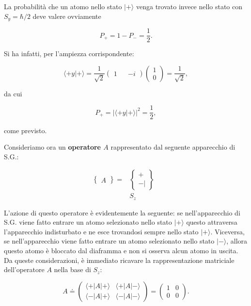 \documentclass[a4paper,12pt,oneside]{book}
\begin{document}
La probabilità che un atomo nello stato $| + \rangle $  venga trovato invece nello stato con $S_y=\hbar/2$ deve valere ovviamente

\begin{equation}
P_+= 1-P_-=\frac{1}{2} .
\end{equation}

Si ha infatti, per l'ampiezza corrispondente:

\begin{equation}
\langle +y | + \rangle = \frac{1}{\sqrt{2}}
\begin{pmatrix}
1 && -i
\end{pmatrix}
\begin{pmatrix}
1 \\
0
\end{pmatrix}=
\frac{1}{\sqrt{2}} ,
\end{equation}

da cui

\begin{equation}
P_+= |\langle +y | + \rangle |^2=\frac{1}{2} ,
\end{equation}

come previsto.

Consideriamo ora un \textbf{operatore $A$} rappresentato dal seguente apparecchio di S.G.:

\begin{eqnarray}
\begin{Bmatrix}
 A
\end{Bmatrix}
=
&\begin{Bmatrix}
 +  \\ - |  
\end{Bmatrix}&\\
&S_z& \nonumber 
\end{eqnarray}

L'azione di questo operatore è evidentemente la seguente:
se nell'apparecchio di S.G. viene fatto entrare un atomo selezionato nello stato $| + \rangle$ questo attraversa l'apparecchio indisturbato e ne esce trovandosi sempre nello stato $| + \rangle $. Viceversa, se nell'apparecchio viene fatto entrare un atomo selezionato nello stato $| - \rangle $, allora questo atomo è bloccato dal diaframma e non si osserva alcun atomo in uscita. Da queste considerazioni, è immediato ricavare la rappresentazione matriciale dell'operatore $A$ nella base di $S_z$:

\begin{equation}
A \doteq 
\begin{pmatrix}
\langle + | A | + \rangle & \langle + | A | - \rangle \\
\langle - | A | + \rangle & \langle - | A | - \rangle
\end{pmatrix}=
\begin{pmatrix}
1 & 0\\
0 & 0
\end{pmatrix} .
\end{equation}
\end{document}
